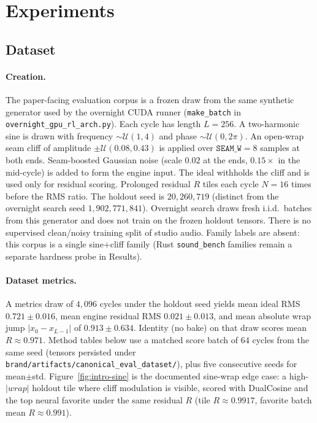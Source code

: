 \section{Experiments}
\label{sec:experiments}

\subsection{Dataset}
\label{sec:dataset}

\paragraph{Creation.}
The paper-facing evaluation corpus is a frozen draw from the same synthetic generator used by the overnight CUDA runner (\texttt{make\_batch} in \texttt{overnight\_gpu\_rl\_arch.py}).
Each cycle has length $L{=}256$.
A two-harmonic sine is drawn with frequency $\sim\mathcal{U}(1,4)$ and phase $\sim\mathcal{U}(0,2\pi)$.
An open-wrap seam cliff of amplitude $\pm\mathcal{U}(0.08,0.43)$ is applied over $\texttt{SEAM\_W}{=}8$ samples at both ends.
Seam-boosted Gaussian noise (scale $0.02$ at the ends, $0.15\times$ in the mid-cycle) is added to form the engine input.
The ideal withholds the cliff and is used only for residual scoring.
Prolonged residual $R$ tiles each cycle $N{=}16$ times before the RMS ratio.
The holdout seed is $20{,}260{,}719$ (distinct from the overnight search seed $1{,}902{,}771{,}841$).
Overnight search draws fresh i.i.d.\ batches from this generator and does not train on the frozen holdout tensors.
There is no supervised clean/noisy training split of studio audio.
Family labels are absent: this corpus is a single sine{+}cliff family (Rust \texttt{sound\_bench} families remain a separate hardness probe in Results).

\paragraph{Dataset metrics.}
A metrics draw of $4{,}096$ cycles under the holdout seed yields mean ideal RMS $0.721\pm0.016$, mean engine residual RMS $0.021\pm0.013$, and mean absolute wrap jump $|x_0-x_{L-1}|$ of $0.913\pm0.634$.
Identity (no bake) on that draw scores mean $R\approx0.971$.
Method tables below use a matched score batch of $64$ cycles from the same seed (tensors persisted under \texttt{brand/artifacts/canonical\_eval\_dataset/}), plus five consecutive seeds for mean$\pm$std.
Figure~\ref{fig:intro-sine} is the documented sine-wrap edge case: a high-$|wrap|$ holdout tile where cliff modulation is visible, scored with DualCosine and the top neural favorite under the same residual $R$ (tile $R\approx0.9917$, favorite batch mean $R\approx0.991$).

